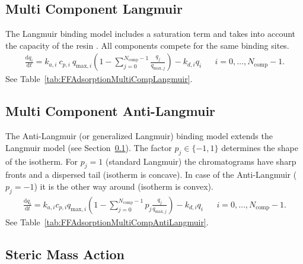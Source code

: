 \subsection{Multi Component Langmuir}\label{sec:MBLangmuir}

The Langmuir binding model includes a saturation term and takes into account the capacity of the resin \cite{Langmuir1916,Guiochon2006}. 
All components compete for the same binding sites.
\begin{align*}
  \frac{\mathrm{d} q_i}{\mathrm{d} t} = k_{a,i}\: c_{p,i}\: q_{\text{max},i} \left( 1 - \sum_{j=0}^{N_{\text{comp}} - 1} \frac{q_j}{q_{\text{max},j}} \right) - k_{d,i} q_i && i = 0, \dots, N_{\text{comp}} - 1.
\end{align*}
See Table~\ref{tab:FFAdsorptionMultiCompLangmuir}.

\subsection{Multi Component Anti-Langmuir}\label{sec:MBAntiLangmuir}

The Anti-Langmuir (or generalized Langmuir) binding model extends the Langmuir model (see Section~\ref{sec:MBLangmuir}). 
The factor $p_j \in \{ -1, 1 \}$ determines the shape of the isotherm.
For $p_j = 1$ (standard Langmuir) the chromatograms have sharp fronts and a dispersed tail (isotherm is concave).
In case of the Anti-Langmuir ($p_j = -1$) it is the other way around (isotherm is convex).
\begin{align*}
    \frac{\mathrm{d} q_i}{\mathrm{d} t} = k_{a,i} c_{p,i} q_{\text{max},i} \left( 1 - \sum_{j=0}^{N_{\text{comp}} - 1} p_j \frac{q_j}{q_{\text{max},j}} \right) - k_{d,i} q_i && i = 0, \dots, N_{\text{comp}} - 1.
\end{align*}
See Table~\ref{tab:FFAdsorptionMultiCompAntiLangmuir}.

\subsection{Steric Mass Action}\label{sec:MBStericMassAction}

